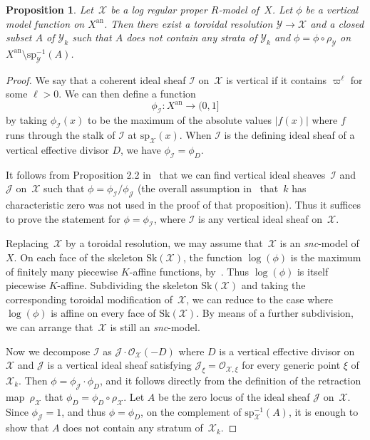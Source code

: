\documentclass[11pt]{article}
\let\mathcal\mathscr
\newtheorem{prop}[equation]{Proposition}
\theoremstyle{definition}
\numberwithin{equation}{subsection}
\newcommand{\cX}{\ensuremath{\mathscr{X}}}
\newcommand{\cY}{\ensuremath{\mathscr{Y}}}
\newcommand{\snc}{\textit{snc}}
\newcommand{\an}{\mathrm{an}}
\newcommand{\Sk}{\mathrm{Sk}}
\newcommand{\spe}{\mathrm{sp}}
\let\unif\varpi
\begin{document}
\begin{prop}\label{prop:adapted}
Let~$\cX$ be a log regular proper $R$\nobreakdash-model of~$X$. Let $\phi$ be a vertical model function on $X^{\an}$. Then there exist a toroidal resolution $\cY\to \cX$ and a closed subset $A$ of $\cY_k$ such that $A$ does not contain any strata of $\cY_k$ and $\phi=\phi\circ \rho_{\cY}$ on $X^{\an}\setminus \spe^{-1}_{\cY}(A)$.
\end{prop}
\begin{proof}
We say that a coherent ideal sheaf $\mathscr{I}$ on~$\cX$ is vertical if it contains $\unif^\ell$ for some $\ell>0$. We can then define a function
\[
\phi_{\mathscr{I}}\colon X^{\an}\to (0,1]
\]
by taking $\phi_{\mathscr{I}}(x)$ to be the maximum of the absolute values $|f(x)|$ where $f$ runs through the stalk of $\mathscr{I}$ at $\spe_{\cX}(x)$. When $\mathscr{I}$ is the defining ideal sheaf of a vertical effective divisor $D$, we have $\phi_{\mathscr{I}}=\phi_D$.

It follows from Proposition 2.2 in~\cite{BFJ16} that we can find vertical ideal sheaves~$\mathscr{I}$ and $\mathscr{J}$ on~$\cX$ such that $\phi=\phi_{\mathscr{I}}/\phi_{\mathscr{J}}$ (the overall assumption in~\cite{BFJ16} that~$k$ has characteristic zero was not used in the proof of that proposition). Thus it suffices to prove the statement for $\phi=\phi_{\mathscr{I}}$, where $\mathscr{I}$ is any vertical ideal sheaf on~$\cX$.

Replacing~$\cX$ by a toroidal resolution, we may assume that~$\cX$ is an \snc-model of~$X$.
On each face of the skeleton $\Sk(\cX)$, the function $\log(\phi)$ is the maximum of finitely many piecewise $K$\nobreakdash-affine functions, by~\cite[3.2.2]{MuNi}. Thus $\log(\phi)$ is itself piecewise $K$\nobreakdash-affine. Subdividing the skeleton $\Sk(\cX)$ and taking the corresponding toroidal modification of~$\cX$, we can reduce to the case where $\log(\phi)$ is affine on every face of $\Sk(\cX)$. By means of a further subdivision, we can arrange that~$\cX$ is still an \snc-model.

Now we decompose $\mathscr{I}$ as $\mathscr{J}\cdot \mathcal{O}_{\cX}(-D)$ where $D$ is a vertical effective divisor on~$\cX$ and $\mathscr{J}$ is a vertical ideal sheaf
satisfying $\mathscr{J}_{\xi}=\mathcal{O}_{\cX,\xi}$ for every generic point $\xi$ of~$\cX_k$. Then $\phi=\phi_{\mathscr{J}}\cdot \phi_D$, and it follows directly from the definition of the retraction map~$\rho_{\cX}$ that $\phi_D=\phi_D\circ \rho_{\cX}$. Let $A$ be the zero locus of the ideal sheaf $\mathscr{J}$ on~$\cX$. Since $\phi_{\mathscr{J}}=1$, and thus $\phi=\phi_D$, on the complement of $\spe^{-1}_{\cX}(A)$, it is enough to show that $A$ does not contain any stratum of~$\cX_k$.


\end{proof}
\end{document}

